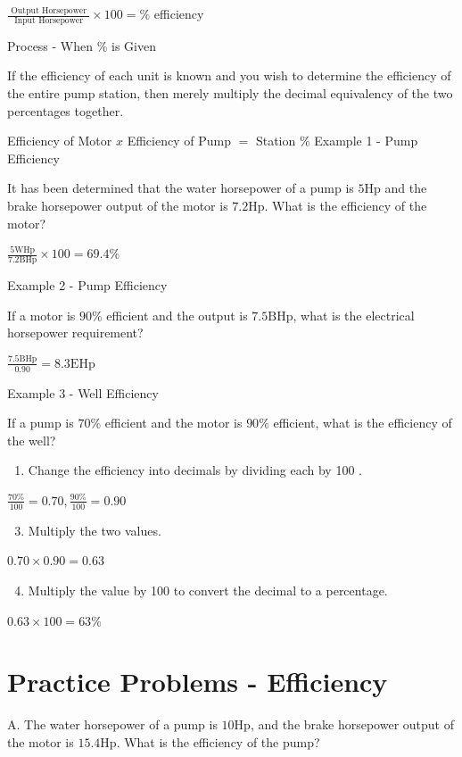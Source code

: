 \documentclass[10pt]{article}
\begin{document}
$\frac{\text { Output Horsepower }}{\text { Input Horsepower }} \times 100=\%$ efficiency

Process - When \% is Given

If the efficiency of each unit is known and you wish to determine the efficiency of the entire pump station, then merely multiply the decimal equivalency of the two percentages together.

Efficiency of Motor $x$ Efficiency of Pump $=$ Station $\%$ Example 1 - Pump Efficiency

It has been determined that the water horsepower of a pump is $5 \mathrm{Hp}$ and the brake horsepower output of the motor is $7.2 \mathrm{Hp}$. What is the efficiency of the motor?

$\frac{5 \mathrm{WHp}}{7.2 \mathrm{BHp}} \times 100=69.4 \%$

Example 2 - Pump Efficiency

If a motor is $90 \%$ efficient and the output is $7.5 \mathrm{BHp}$, what is the electrical horsepower requirement?

$\frac{7.5 \mathrm{BHp}}{0.90}=8.3 \mathrm{EHp}$

Example 3 - Well Efficiency

If a pump is $70 \%$ efficient and the motor is $90 \%$ efficient, what is the efficiency of the well?

\begin{enumerate}
  \item Change the efficiency into decimals by dividing each by 100 .
\end{enumerate}
$\frac{70 \%}{100}=0.70, \frac{90 \%}{100}=0.90$

\begin{enumerate}
  \setcounter{enumi}{2}
  \item Multiply the two values.
\end{enumerate}
$0.70 \times 0.90=0.63$

\begin{enumerate}
  \setcounter{enumi}{3}
  \item Multiply the value by 100 to convert the decimal to a percentage.
\end{enumerate}
$0.63 \times 100=63 \%$

\section{Practice Problems - Efficiency}
A. The water horsepower of a pump is $10 \mathrm{Hp}$, and the brake horsepower output of the motor is $15.4 \mathrm{Hp}$. What is the efficiency of the pump?
\end{document}

